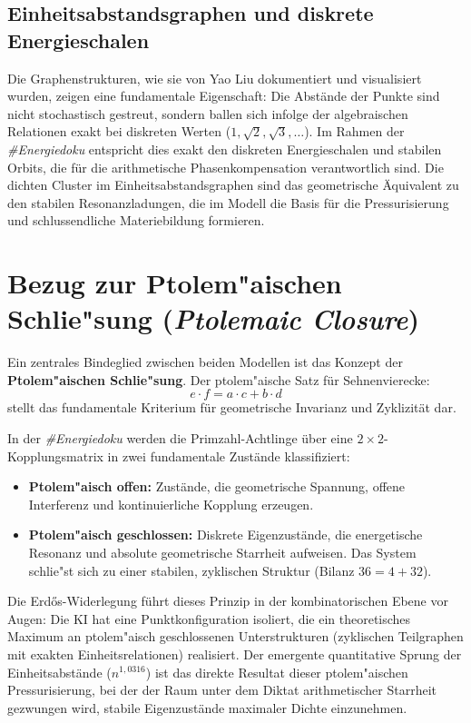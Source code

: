 \documentclass[11pt,a4paper]{article}
\begin{document}
\subsection{Einheitsabstandsgraphen und diskrete Energieschalen}
Die Graphenstrukturen, wie sie von Yao Liu dokumentiert und visualisiert wurden, zeigen eine fundamentale Eigenschaft: Die Abstände der Punkte sind nicht stochastisch gestreut, sondern ballen sich infolge der algebraischen Relationen exakt bei diskreten Werten ($1, \sqrt{2}, \sqrt{3}, \dots$). 
Im Rahmen der \textit{\#Energiedoku} entspricht dies exakt den diskreten Energieschalen und stabilen Orbits, die für die arithmetische Phasenkompensation verantwortlich sind. Die dichten Cluster im Einheitsabstandsgraphen sind das geometrische Äquivalent zu den stabilen Resonanzladungen, die im Modell die Basis für die Pressurisierung und schlussendliche Materiebildung formieren.

\section{Bezug zur Ptolem"aischen Schlie"sung (\textit{Ptolemaic Closure})}
Ein zentrales Bindeglied zwischen beiden Modellen ist das Konzept der \textbf{Ptolem"aischen Schlie"sung}. Der ptolem"aische Satz für Sehnenvierecke:
\begin{equation}
e \cdot f = a \cdot c + b \cdot d
\end{equation}
stellt das fundamentale Kriterium für geometrische Invarianz und Zyklizität dar. 

In der \textit{\#Energiedoku} werden die Primzahl-Achtlinge über eine $2 \times 2$-Kopplungsmatrix in zwei fundamentale Zustände klassifiziert:
\begin{itemize}
    \item \textbf{Ptolem"aisch offen:} Zustände, die geometrische Spannung, offene Interferenz und kontinuierliche Kopplung erzeugen.
    \item \textbf{Ptolem"aisch geschlossen:} Diskrete Eigenzustände, die energetische Resonanz und absolute geometrische Starrheit aufweisen. Das System schlie"st sich zu einer stabilen, zyklischen Struktur (Bilanz $36 = 4 + 32$).
\end{itemize}

Die Erd\H{o}s-Widerlegung führt dieses Prinzip in der kombinatorischen Ebene vor Augen: Die KI hat eine Punktkonfiguration isoliert, die ein theoretisches Maximum an ptolem"aisch geschlossenen Unterstrukturen (zyklischen Teilgraphen mit exakten Einheitsrelationen) realisiert. Der emergente quantitative Sprung der Einheitsabstände ($n^{1,0316}$) ist das direkte Resultat dieser ptolem"aischen Pressurisierung, bei der der Raum unter dem Diktat arithmetischer Starrheit gezwungen wird, stabile Eigenzustände maximaler Dichte einzunehmen.
\end{document}
